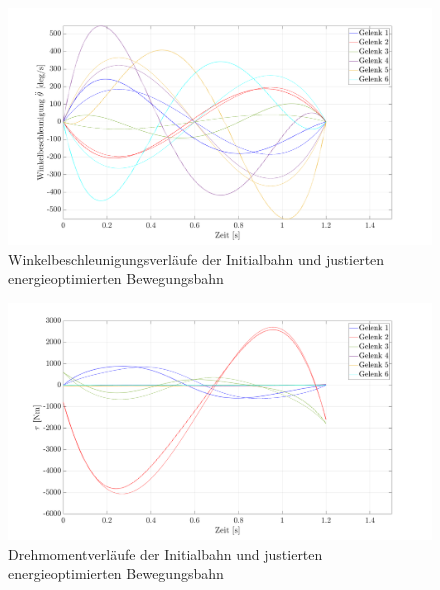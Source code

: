 %
\begin{figure}[tbph]
	\centering
	\includegraphics[width=1\linewidth]{images/Optimierungsergebnisse_up/accoptfinal}
	\caption{Winkelbeschleunigungsverläufe der Initialbahn und justierten energieoptimierten Bewegungsbahn}
	\label{fig:accoptfinal}
\end{figure}
%
%
\begin{figure}[tbph]
	\centering
	\includegraphics[width=1\linewidth]{images/Optimierungsergebnisse_up/tauoptfinal}
	\caption{Drehmomentverläufe der Initialbahn und justierten energieoptimierten Bewegungsbahn}
	\label{fig:tauoptfinal}
\end{figure}

